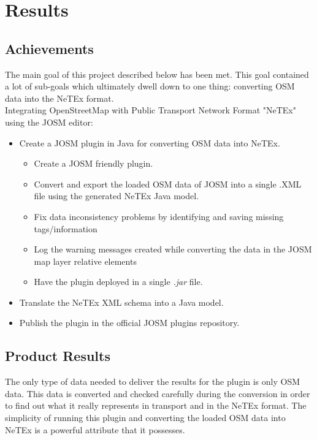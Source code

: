 \chapter{Results}
\section{Achievements}
The main goal of this project described below has been met. This goal contained a lot of sub-goals which ultimately dwell down to one thing: converting OSM data into the NeTEx format.\\
\newline
Integrating OpenStreetMap with Public Transport Network Format "NeTEx" using the JOSM editor:
\begin{itemize}
	\item{Create a JOSM plugin in Java for converting OSM data into NeTEx.}
	\begin{itemize}
		\item{Create a JOSM friendly plugin.}
		\item{Convert and export the loaded OSM data of JOSM into a single .XML file using the generated NeTEx Java model.}
		\item{Fix data inconsistency problems by identifying and saving missing tags/information}
		\item{Log the warning messages created while converting the data in the JOSM map layer relative elements}
		\item{Have the plugin deployed in a single \textit{.jar} file.}
	\end{itemize}
	\item{Translate the NeTEx XML schema into a Java model.}
	\item{Publish the plugin in the official JOSM plugins repository.}
\end{itemize}
\newpage
\section{Product Results}
The only type of data needed to deliver the results for the plugin is only OSM data. This data is converted and checked carefully during the conversion in order to find out what it really represents in transport and in the NeTEx format. The simplicity of running this plugin and converting the loaded OSM data into NeTEx is a powerful attribute that it possesses.\\
